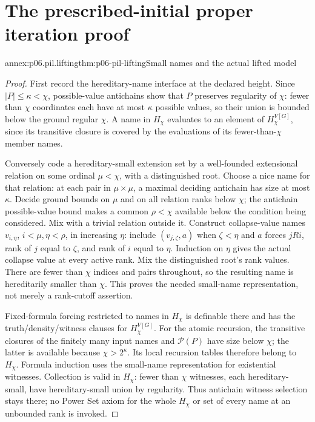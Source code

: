 \section{The prescribed-initial proper iteration proof}
\label{annex:p06-proper-iteration-lemma}

\begin{annexitem}{annex:p06.pil.lifting}{thm:p06-pil-lifting}{Small names and the actual lifted model}
\begin{proof}
First record the hereditary-name interface at the declared height.
Since \(|P|\leq\kappa<\chi\), possible-value antichains show that
\(P\) preserves regularity of \(\chi\): fewer than \(\chi\) coordinates
each have at most \(\kappa\) possible values, so their union is bounded
below the ground regular \(\chi\). A name in \(H_\chi\) evaluates
to an element of \(H_\chi^{V[G]}\), since its transitive closure is
covered by the evaluations of its fewer-than-\(\chi\) member names.

Conversely code a hereditary-small extension set by a well-founded
extensional relation on some ordinal \(\mu<\chi\), with a distinguished
root. Choose a nice name for that relation: at each pair in
\(\mu\times\mu\), a maximal deciding antichain has size at most
\(\kappa\). Decide ground bounds on \(\mu\) and on all relation ranks
below \(\chi\); the antichain possible-value bound makes a common
\(\rho<\chi\) available below the condition being considered.
Mix with a trivial relation outside it. Construct collapse-value names
\(v_{i,\eta}\), \(i<\mu,\eta<\rho\), in increasing \(\eta\): include
\((v_{j,\zeta},a)\) when \(\zeta<\eta\) and \(a\) forces
\(jRi\), rank of \(j\) equal to \(\zeta\), and rank of \(i\)
equal to \(\eta\). Induction on \(\eta\) gives the actual collapse
value at every active rank. Mix the distinguished root's rank values.
There are fewer than \(\chi\) indices and pairs throughout, so the
resulting name is hereditarily smaller than \(\chi\). This proves
the needed small-name representation, not merely a rank-cutoff assertion.

Fixed-formula forcing restricted to names in \(H_\chi\) is definable
there and has the truth/density/witness clauses for \(H_\chi^{V[G]}\).
For the atomic recursion, the transitive closures of the finitely many
input names and \(\mathcal P(P)\) have size below \(\chi\); the latter
is available because \(\chi>2^\kappa\). Its local recursion tables
therefore belong to \(H_\chi\). Formula induction uses the small-name
representation for existential witnesses. Collection is valid in
\(H_\chi\): fewer than \(\chi\) witnesses, each hereditary-small,
have hereditary-small union by regularity. Thus antichain witness
selection stays there; no Power Set axiom for the whole \(H_\chi\)
or set of every name at an unbounded rank is invoked.


\end{proof}
\end{annexitem}
